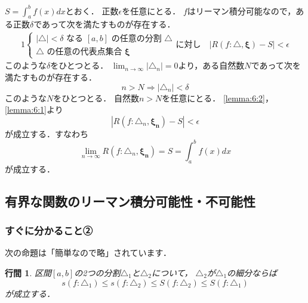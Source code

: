 \documentclass{article}
\makeatletter
\renewenvironment{proof}[1][\proofname]{\par
        \pushQED{\qed}
        \normalfont
        \topsep6\p@\@plus6\p@ \trivlist
        \item[\hskip\labelsep{\bfseries #1}\@addpunct{\bfseries}]\ignorespaces
    }{%
        \popQED\endtrivlist\@endpefalse
    }
\renewcommand{\proofname}{\underline{証明.}}
\newtheorem{lemma}{行間}
\makeatother
\begin{document}
\begin{proof}
    $S = \int_a^b f(x) dx$とおく．
    正数$\epsilon$を任意にとる．
    $f$はリーマン積分可能なので，ある正数$\delta$であって次を満たすものが存在する．
    \begin{alignat}{1}
        \begin{cases}
            |\triangle| < \delta \mbox{ なる } [a, b] \mbox{ の任意の分割 } \triangle \\
            \triangle \mbox{ の任意の代表点集合 } \mathbf{\xi}
        \end{cases}
        \mbox{に対し} \quad
        |R(f: \triangle, \mathbf{\xi}) - S| < \epsilon
        \label{lemma:6:1}
    \end{alignat}
    このような$\delta$をひとつとる．
    $\lim_{n\rightarrow\infty} |\triangle_n| = 0$より，ある自然数$N$であって次を満たすものが存在する．
    \begin{equation}
        n > N \Longrightarrow |\triangle_n| < \delta
        \label{lemma:6:2}
    \end{equation}
    このような$N$をひとつとる．
    自然数$n > N$を任意にとる．
    \cref{lemma:6:2}，\cref{lemma:6:1}より
    \begin{equation}
        |R(f: \triangle_n, \mathbf{\xi_n}) - S| < \epsilon
    \end{equation}
    が成立する．すなわち
    \begin{equation}
        \lim_{n\rightarrow\infty} R(f: \triangle_n, \mathbf{\xi_n})
        =
        S
        =
        \int_a^b f(x) dx
    \end{equation}
    が成立する．
\end{proof}

\setcounter{subsection}{3}
\subsection{有界な関数のリーマン積分可能性・不可能性}
\subsubsection{すぐに分かること②}
次の命題は「簡単なので略」されています．

\begin{screen}
    \begin{lemma}
        区間$[a, b]$の2つの分割$\triangle_1$と$\triangle_2$について，
        $\triangle_2$が$\triangle_1$の細分ならば
        \begin{equation}
            s(f:\triangle_1) \leq s(f:\triangle_2) \leq S(f: \triangle_2) \leq S(f: \triangle_1)
            \label{lemma:7}
        \end{equation}
        が成立する．
    \end{lemma}
\end{screen}
\end{document}
